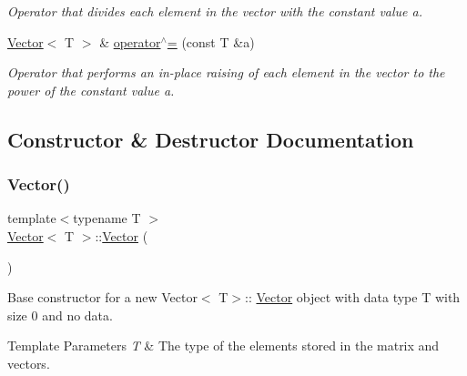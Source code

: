 \begin{DoxyCompactItemize}
\begin{DoxyCompactList}\small\item\em Operator that divides each element in the vector with the constant value {\ttfamily a}. \end{DoxyCompactList}\item 
\mbox{\hyperlink{classVector}{Vector}}$<$ T $>$ \& \mbox{\hyperlink{classVector_a6767000b5cbf4999aa301eb24a7b74fc}{operator$^\wedge$=}} (const T \&a)
\begin{DoxyCompactList}\small\item\em Operator that performs an in-\/place raising of each element in the vector to the power of the constant value {\ttfamily a}. \end{DoxyCompactList}\end{DoxyCompactItemize}


\subsection{Constructor \& Destructor Documentation}
\mbox{\label{classVector_a39d6069675db4ecfc1ab81d440da759a}} 
\subsubsection{\texorpdfstring{Vector()}{Vector()}\hspace{0.1cm}{\footnotesize\ttfamily [1/5]}}
{\footnotesize\ttfamily template$<$typename T $>$ \\
\mbox{\hyperlink{classVector}{Vector}}$<$ T $>$\+::\mbox{\hyperlink{classVector}{Vector}} (\begin{DoxyParamCaption}{ }\end{DoxyParamCaption})}



Base constructor for a new Vector$<$ T$>$\+:\+: \mbox{\hyperlink{classVector}{Vector}} object with data type {\ttfamily T} with size 0 and no data. 


\begin{DoxyTemplParams}{Template Parameters}
{\em T} & The type of the elements stored in the matrix and vectors. \\
\hline
\end{DoxyTemplParams}
\mbox{\label{classVector_a8575836acd6e8c9a2297b5ba6d14008c}} 
